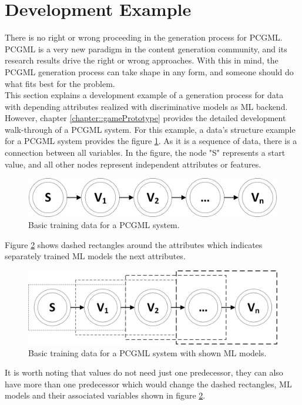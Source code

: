 \documentclass[MGS,Master,english]{twbook}%
\begin{document}
\section{Development Example} \label{PCGML::devExample}
There is no right or wrong proceeding in the generation process for PCGML. PCGML is a very new paradigm in the content generation community, and its research results drive the right or wrong approaches. With this in mind, the PCGML generation process can take shape in any form, and someone should do what fits best for the problem.\\
This section explains a development example of a generation process for data with depending attributes realized with discriminative models as ML backend. However, chapter \ref{chapter::gamePrototype} provides the detailed development walk-through of a PCGML system. For this example, a data’s structure example for a PCGML system provides the figure \ref{fig::PCGML::devExample::sequenceBase}. As it is a sequence of data, there is a connection between all variables. In the figure, the node "S" represents a start value, and all other nodes represent independent attributes or features. 
\begin{figure}[!htbp]
	\centering
	\includegraphics[width=0.5\linewidth]{PICs/PCGML_development_example_sequence_base}
	\caption{Basic training data for a PCGML system. }\label{fig::PCGML::devExample::sequenceBase}
\end{figure}
Figure \ref{fig::PCGML::devExample::sequenceWithModels} shows dashed rectangles around the attributes which indicates separately trained ML models the next attributes. 
\begin{figure}[!htbp]
	\centering
	\includegraphics[width=0.55\linewidth]{PICs/PCGML_development_example_sequence_with_models}
	\caption{Basic training data for a PCGML system with shown ML models.}\label{fig::PCGML::devExample::sequenceWithModels}
\end{figure}
It is worth noting that values do not need just one predecessor, they can also have more than one predecessor which would change the dashed rectangles, ML models and their associated variables shown in figure \ref{fig::PCGML::devExample::sequenceWithModels}.
\end{document}
